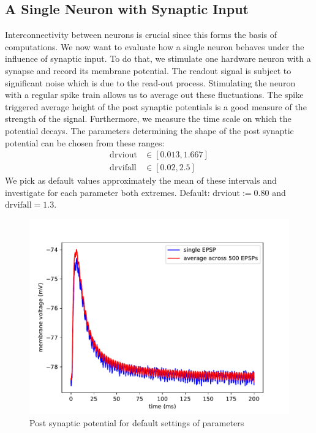 \documentclass[a4paper,twocolumn]{article}
\begin{document}
\subsection{A Single Neuron with Synaptic Input}
Interconnectivity between neurons is crucial since this forms the basis of
computations.  We now want to evaluate how a single neuron behaves under the influence
 of synaptic input.  To do that,  we stimulate one hardware neuron with a synapse
 and record its membrane potential.  The readout signal is subject to significant
 noise which is due to the read-out process.  Stimulating the neuron with a regular
 spike train allows us to average out these fluctuations.  The spike triggered average
 height of the post synaptic potentials is a good measure of the strength of the signal.
 Furthermore,  we measure the time scale on which the potential decays.
The parameters determining the shape of the post synaptic potential can be chosen
from these ranges:
\begin{align*}
	\text{drviout} &\in \left[ 0.013, 1.667  \right] \\
	\text{drvifall} &\in \left[ 0.02,  2.5  \right]
\end{align*}
We pick as default values approximately the mean of these intervals and
investigate for each parameter both extremes.  Default: $\text{drviout} := 0.80$
and $\text{drvifall}=1.3$.
\begin{figure}[ht]
    \centering
    \includegraphics[width=.5\textwidth]{figures/epsp_default.pdf}
    \caption{Post synaptic potential for default settings of parameters}
    \label{fig:epsp_default}
\end{figure}
\end{document}
